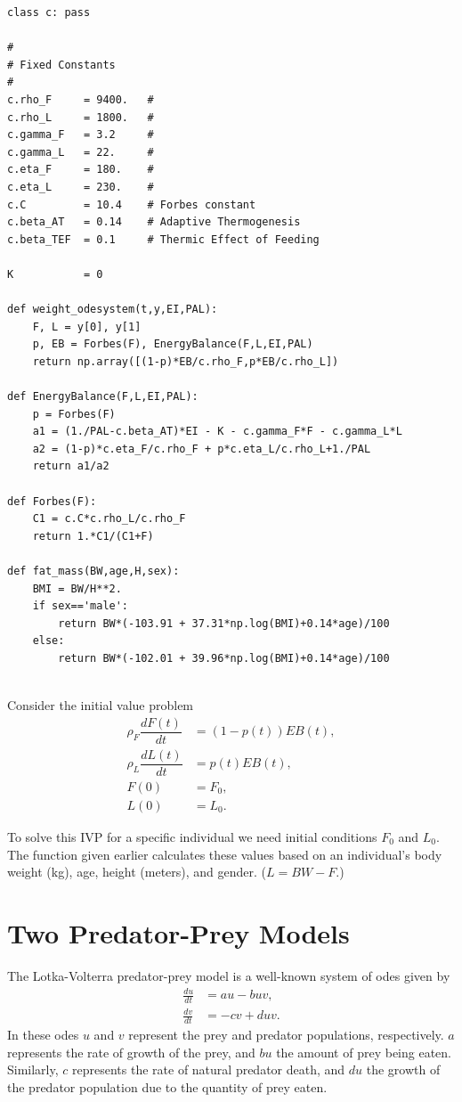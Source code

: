 \begin{lstlisting}
class c: pass

# 
# Fixed Constants
# 
c.rho_F		= 9400.   # 
c.rho_L		= 1800.   #
c.gamma_F	= 3.2     # 
c.gamma_L	= 22.     # 
c.eta_F		= 180.    # 
c.eta_L		= 230.    # 
c.C			= 10.4    # Forbes constant
c.beta_AT	= 0.14    # Adaptive Thermogenesis
c.beta_TEF	= 0.1     # Thermic Effect of Feeding

K 			= 0

def weight_odesystem(t,y,EI,PAL):
	F, L = y[0], y[1]
	p, EB = Forbes(F), EnergyBalance(F,L,EI,PAL)
	return np.array([(1-p)*EB/c.rho_F,p*EB/c.rho_L]) 

def EnergyBalance(F,L,EI,PAL):
	p = Forbes(F)
	a1 = (1./PAL-c.beta_AT)*EI - K - c.gamma_F*F - c.gamma_L*L
	a2 = (1-p)*c.eta_F/c.rho_F + p*c.eta_L/c.rho_L+1./PAL
	return a1/a2

def Forbes(F):
	C1 = c.C*c.rho_L/c.rho_F
	return 1.*C1/(C1+F)

def fat_mass(BW,age,H,sex):
	BMI = BW/H**2.
	if sex=='male': 
		return BW*(-103.91 + 37.31*np.log(BMI)+0.14*age)/100
	else: 
		return BW*(-102.01 + 39.96*np.log(BMI)+0.14*age)/100
	
\end{lstlisting}



\begin{problem}
Consider the initial value problem
\begin{subequations}
\begin{align*}
\rho_F \dfrac{dF(t)}{dt} &= (1-p(t)) EB(t),\\ %
\rho_L \dfrac{dL(t)}{dt} &= p(t) EB(t),\\%
F(0) &= F_0, \\
L(0) &= L_0.
\end{align*}
\end{subequations}

To solve this IVP for a specific individual we need initial conditions $F_0$ and $L_0.$ The function  given earlier calculates these values based on an individual's body weight (kg), age, height (meters), and gender. ($L = BW - F$.)

\end{problem}



\section{Two Predator-Prey Models}
The Lotka-Volterra predator-prey model is a well-known 
system of odes given by 
\begin{align*}
	\frac{du}{dt} &= au - buv,\\
	\frac{dv}{dt} &= -cv + duv.
\end{align*}
In these odes $u$ and $v$ represent the prey and predator 
populations, respectively. $a$ represents the rate of growth 
of the prey, and $bu$ the amount of prey being eaten. 
Similarly, $c$ represents the rate of natural predator death, and $du$ the growth of the predator 
population due to the quantity of prey eaten.

